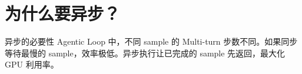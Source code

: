 \section{为什么要异步？}
\begin{importantbox}{异步的必要性}
Agentic Loop 中，不同 sample 的 Multi-turn 步数不同。如果同步等待最慢的 sample，效率极低。异步执行让已完成的 sample 先返回，最大化 GPU 利用率。
\end{importantbox}

